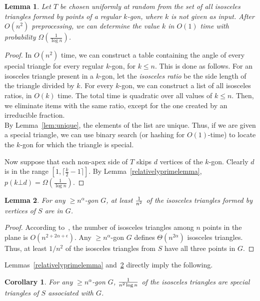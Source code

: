 \documentclass{article}
\newtheorem{lemma}{Lemma}
\newtheorem{cor}{Corollary}
\begin{document}
\begin{lemma}
\label{lem:table}
Let $T$ be chosen uniformly at random
from the set of all isosceles triangles formed by points of a regular $k$-gon, where $k$ is
not given as input.
After $O(n^2)$ preprocessing, we can determine the value $k$ in $O(1)$ time
 with probability $\Omega(\frac{1}{\log n})$.
\end{lemma}
\begin{proof}
In $O(n^2)$ time, we can construct a table containing the angle of every special triangle for
every regular $k$-gon, for $k{\leq}n$.   This is done as follows.
For an isosceles triangle present in a $k$-gon, let the {\em isosceles ratio} be the side length of the triangle divided by $k$.
For every $k$-gon, we can construct a list of all isosceles ratios, in $O(k)$ time.
The total time is quadratic over all values of $k\leq n$.  Then, we eliminate items with the same ratio, except for the one
created by an irreducible fraction.\\

 By Lemma~\ref{lem:unique}, the elements of the list are unique.
Thus, if we are given a special triangle, we can use binary search (or hashing for $O(1)$-time) to locate
the $k$-gon for which the triangle is special.

Now suppose that each non-apex side of $T$ skips $d$ vertices of the $k$-gon.
Clearly $d$ is in the range $[1, \lceil \frac{k}{2}-1\rceil ]$.
By Lemma~\ref{relativelyprimelemma}, $p(k\bot d) = \Omega(\frac{1}{\log n})$.  
\end{proof}


\begin{lemma}
\label{big-gon-many-iso}
For any ${\geq} n^{\alpha}$-gon $G$, at least $1 \over n^2$ of the
isosceles triangles formed by vertices of  $S$ are in $G$.
\end{lemma}

\begin{proof}
According to~\cite{pach}, the number of isosceles triangles among $n$
points in the plane is $O(n^{2{+}2\alpha{+}\epsilon})$. Any ${\geq}
n^{\alpha}$-gon $G$ defines $\Theta(n^{2\alpha})$ isosceles triangles. Thus,
at least $1/n^2$ of the isosceles triangles from $S$ have all three points in $G$.
\end{proof}

\noindent Lemmas~\ref{relativelyprimelemma} and~\ref{big-gon-many-iso} directly imply the following.
\begin{cor}
\label{c4}
For any ${\geq} n^{\alpha}$-gon $G$, $1 \over n^2 \log n $ of the
isosceles triangles are special triangles of $S$ associated with $G$.
\end{cor}
\end{document}
